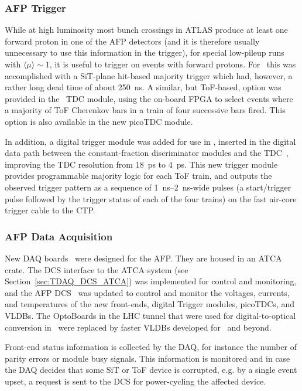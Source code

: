 \documentclass[cernpreprint, atlasdraft=false, UKenglish,british,orcidlogo, texmf, orcidlogo]{atlasdoc}
\begin{document}
 
\subsubsection{AFP Trigger \label{ss:afptrig}} 
While at high luminosity most bunch crossings in ATLAS produce at least one forward proton in one of the \gls{AFP} detectors (and it is therefore usually unnecessary to use this information in the trigger), for special low-pileup runs with $\langle\mu\rangle\sim 1$, it is useful to trigger on events with forward protons. For \RunTwo\ this was accomplished with a \gls{SiT}-plane hit-based majority trigger which had, however, a rather long dead time of about \SI{250}{\ns}. A similar, but \gls{ToF}-based, option was provided in the \RunTwo\ \gls{TDC} module, using the on-board \gls{FPGA} to select events where a majority of \gls{ToF} Cherenkov bars in a train of four successive bars fired. This option is also available in the new pico\gls{TDC} module.
 
In addition, a digital trigger module was added for use in \RunThr, inserted in the digital data path between the constant-fraction discriminator modules and the \gls{TDC}~\cite{Zich_2019}, improving the \gls{TDC} resolution from \SI{18}{\ps} to \SI{4}{\ps}.
This new trigger module provides programmable majority logic for each \gls{ToF} train, and outputs the observed trigger pattern as a sequence of 
\SIrange{1}{2}{\ns}-wide  pulses (a start/trigger pulse followed by the trigger status of each of the four trains) on the fast air-core trigger cable to the \gls{CTP}.
 
\subsubsection{AFP Data Acquisition} 
New \gls{DAQ} boards~\cite{bib:SLAC-RCE} were designed for the \gls{AFP}. They are housed in an \gls{ATCA} crate.
The \gls{DCS} interface to the \gls{ATCA} system (see Section~\ref{sec:TDAQ_DCS_ATCA}) was implemented for control and
monitoring, and the \gls{AFP} \gls{DCS}~\cite{Banas_2017} was updated
to control and monitor the voltages, currents, and temperatures
of the new front-ends, digital Trigger modules, pico\glspl{TDC}, and \glspl{VLDB}.
The OptoBoards in the \gls{LHC} tunnel that were used for digital-to-optical conversion in \RunTwo\ were replaced by faster \glspl{VLDB} developed for \RunThr\ and beyond.
 
 
Front-end status information is collected by the \gls{DAQ}, for instance the number of parity errors or module busy signals. This information is monitored and in case the \gls{DAQ} decides that some \gls{SiT} or \gls{ToF} device is corrupted, e.g. by a single event upset, a request is sent to the \gls{DCS} for power-cycling the affected device.
 
\end{document}
